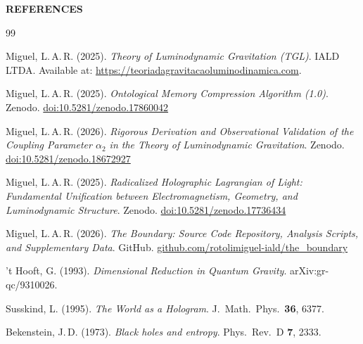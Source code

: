 \documentclass[12pt,a4paper,twoside]{article}
\begin{document}
\vspace{1cm}

%
%

\newpage
{}
\begin{center}
\vspace*{1cm}
{\huge\bfseries\color{tglblue} REFERENCES}\\[1cm]
\end{center}

\begin{thebibliography}{99}

Miguel, L.\,A.\,R. (2025).
\textit{Theory of Luminodynamic Gravitation (TGL)}.
IALD LTDA. Available at: \url{https://teoriadagravitacaoluminodinamica.com}.

Miguel, L.\,A.\,R. (2025).
\textit{Ontological Memory Compression Algorithm (1.0)}.
Zenodo.
\href{https://doi.org/10.5281/zenodo.17860042}{doi:10.5281/zenodo.17860042}

Miguel, L.\,A.\,R. (2026).
\textit{Rigorous Derivation and Observational Validation of the Coupling Parameter $\alpha_2$ in the Theory of Luminodynamic Gravitation}.
Zenodo.
\href{https://doi.org/10.5281/zenodo.18672927}{doi:10.5281/zenodo.18672927}

Miguel, L.\,A.\,R. (2025).
\textit{Radicalized Holographic Lagrangian of Light: Fundamental Unification between Electromagnetism, Geometry, and Luminodynamic Structure}.
Zenodo.
\href{https://doi.org/10.5281/zenodo.17736434}{doi:10.5281/zenodo.17736434}

Miguel, L.\,A.\,R. (2026).
\textit{The Boundary: Source Code Repository, Analysis Scripts, and Supplementary Data}.
GitHub.
\href{https://github.com/rotolimiguel-iald/the_boundary}{github.com/rotolimiguel-iald/the\_boundary}

't Hooft, G. (1993).
\textit{Dimensional Reduction in Quantum Gravity}.
arXiv:gr-qc/9310026.

Susskind, L. (1995).
\textit{The World as a Hologram}.
J.\ Math.\ Phys.\ \textbf{36}, 6377.

Bekenstein, J.\,D. (1973).
\textit{Black holes and entropy}.
Phys.\ Rev.\ D \textbf{7}, 2333.


\end{thebibliography}
\end{document}

